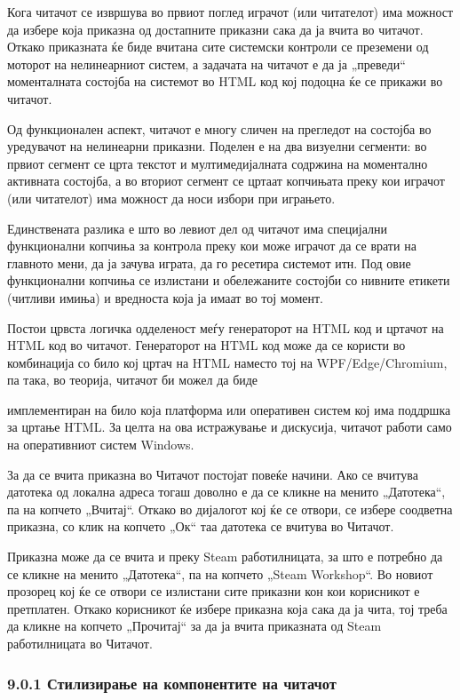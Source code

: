 Кога читачот се извршува во првиот поглед играчот (или читателот) има можност да избере која приказна од достапните приказни сака да ја вчита во читачот. Откако приказната ќе биде вчитана сите системски контроли се преземени од моторот на нелинеарниот систем, а задачата на читачот е да ја „преведи“ моменталната состојба на системот во HTML код кој подоцна ќе се прикажи во читачот.

Од функционален аспект, читачот е многу сличен на прегледот на состојба во уредувачот на нелинеарни приказни. Поделен е на два визуелни сегменти: во првиот сегмент се црта текстот и мултимедијалната содржина на моментално активната состојба, а во вториот сегмент се цртаат копчињата преку кои играчот (или читателот) има можност да носи избори при играњето.

Единствената разлика е што во левиот дел од читачот има специјални функционални копчиња за контрола преку кои може играчот да се врати на главното мени, да ја зачува играта, да го ресетира системот итн. Под овие функционални копчиња се излистани и обележаните состојби со нивните етикети (читливи имиња) и вредноста која ја имаат во тој момент.

Постои црвста логичка одделеност меѓу генераторот на HTML код и цртачот на HTML код во читачот. Генераторот на HTML код може да се користи во комбинација со било кој цртач на HTML наместо тој на WPF/Edge/Chromium, па така, во теорија, читачот би можел да биде


имплементиран на било која платформа или оперативен систем кој има поддршка за цртање HTML. За целта на ова истражување и дискусија, читачот работи само на оперативниот систем Windows.

За да се вчита приказна во Читачот постојат повеќе начини. Ако се вчитува датотека од локална адреса тогаш доволно е да се кликне на менито „Датотека“, па на копчето „Вчитај“. Откако во дијалогот кој ќе се отвори, се избере соодветна приказна, со клик на копчето „Ок“ таа датотека се вчитува во Читачот.

Приказна може да се вчита и преку Steam работилницата, за што е потребно да се кликне на менито „Датотека“, па на копчето „Steam Workshop“. Во новиот прозорец кој ќе се отвори се излистани сите приказни кон кои корисникот е претплатен. Откако корисникот ќе избере приказна која сака да ја чита, тој треба да кликне на копчето „Прочитај“ за да ја вчита приказната од Steam работилницата во Читачот.

\subsubsection{9.0.1 Стилизирање на компонентите на читачот}

